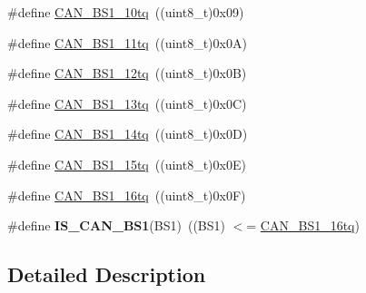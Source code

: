 \begin{DoxyCompactItemize}
\item 
\#define \hyperlink{group___c_a_n__time__quantum__in__bit__segment__1_gaf1b474aa632787e70bedd0c5dfdbf5ed}{C\-A\-N\-\_\-\-B\-S1\-\_\-10tq}~((uint8\-\_\-t)0x09)
\item 
\#define \hyperlink{group___c_a_n__time__quantum__in__bit__segment__1_ga4f765ffbe7fda4fb6d0fde7bc4058a14}{C\-A\-N\-\_\-\-B\-S1\-\_\-11tq}~((uint8\-\_\-t)0x0\-A)
\item 
\#define \hyperlink{group___c_a_n__time__quantum__in__bit__segment__1_ga14c4e928f615babc14c6a9e80ee86a6c}{C\-A\-N\-\_\-\-B\-S1\-\_\-12tq}~((uint8\-\_\-t)0x0\-B)
\item 
\#define \hyperlink{group___c_a_n__time__quantum__in__bit__segment__1_ga2087caec94be44837c1e6965da7f6236}{C\-A\-N\-\_\-\-B\-S1\-\_\-13tq}~((uint8\-\_\-t)0x0\-C)
\item 
\#define \hyperlink{group___c_a_n__time__quantum__in__bit__segment__1_gac0c71e1020a4fbaf66bce754bd54d8cb}{C\-A\-N\-\_\-\-B\-S1\-\_\-14tq}~((uint8\-\_\-t)0x0\-D)
\item 
\#define \hyperlink{group___c_a_n__time__quantum__in__bit__segment__1_gaa52c8674dc7caae1089e5276cd13db5f}{C\-A\-N\-\_\-\-B\-S1\-\_\-15tq}~((uint8\-\_\-t)0x0\-E)
\item 
\#define \hyperlink{group___c_a_n__time__quantum__in__bit__segment__1_ga3be52c699f5618cc318c143ee42f5966}{C\-A\-N\-\_\-\-B\-S1\-\_\-16tq}~((uint8\-\_\-t)0x0\-F)
\item 
\hypertarget{group___c_a_n__time__quantum__in__bit__segment__1_ga225f1457e1c6b8fc3b5af0f463933152}{\#define {\bfseries I\-S\-\_\-\-C\-A\-N\-\_\-\-B\-S1}(B\-S1)~((B\-S1) $<$= \hyperlink{group___c_a_n__time__quantum__in__bit__segment__1_ga3be52c699f5618cc318c143ee42f5966}{C\-A\-N\-\_\-\-B\-S1\-\_\-16tq})}\label{group___c_a_n__time__quantum__in__bit__segment__1_ga225f1457e1c6b8fc3b5af0f463933152}

\end{DoxyCompactItemize}


\subsection{Detailed Description}


